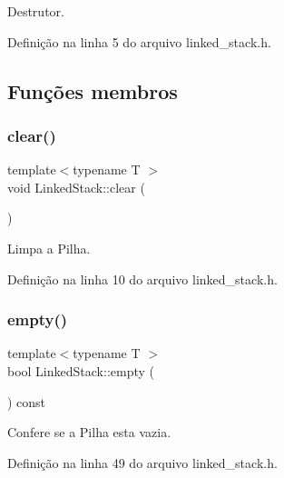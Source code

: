 Destrutor. 



Definição na linha 5 do arquivo linked\+\_\+stack.\+h.



\subsection{Funções membros}
\mbox{\label{classstructures_1_1_linked_stack_ac0491cef165f5beb3a00a4979aa8c349}} 
\subsubsection{\texorpdfstring{clear()}{clear()}}
{\footnotesize\ttfamily template$<$typename T $>$ \\
void Linked\+Stack\+::clear (\begin{DoxyParamCaption}{ }\end{DoxyParamCaption})}



Limpa a Pilha. 



Definição na linha 10 do arquivo linked\+\_\+stack.\+h.

\mbox{\label{classstructures_1_1_linked_stack_a42b81c0a1c2e0ab6ef2e0fe04a584001}} 
\subsubsection{\texorpdfstring{empty()}{empty()}}
{\footnotesize\ttfamily template$<$typename T $>$ \\
bool Linked\+Stack\+::empty (\begin{DoxyParamCaption}{ }\end{DoxyParamCaption}) const}



Confere se a Pilha esta vazia. 



Definição na linha 49 do arquivo linked\+\_\+stack.\+h.



